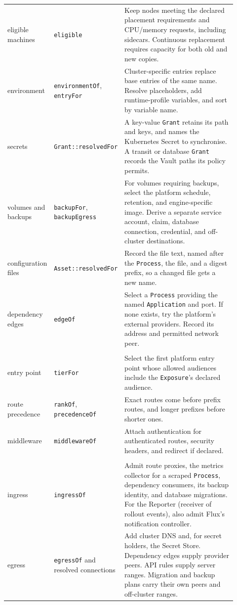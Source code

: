 \begin{longtable}{>{\raggedright\arraybackslash}p{0.19\linewidth}>{\raggedright\arraybackslash}p{0.24\linewidth}>{\raggedright\arraybackslash}p{0.49\linewidth}}
eligible machines & \texttt{eligible} & Keep nodes meeting the declared placement requirements and CPU/memory requests, including sidecars. Continuous replacement requires capacity for both old and new copies. \\
environment & \texttt{environmentOf}, \texttt{entryFor} & Cluster-specific entries replace base entries of the same name. Resolve placeholders, add runtime-profile variables, and sort by variable name. \\
secrets & \texttt{Grant::resolvedFor} & A key-value \texttt{Grant} retains its path and keys, and names the Kubernetes Secret to synchronise. A transit or database \texttt{Grant} records the Vault paths its policy permits. \\
volumes and backups & \texttt{backupFor}, \texttt{backupEgress} & For volumes requiring backups, select the platform schedule, retention, and engine-specific image. Derive a separate service account, claim, database connection, credential, and off-cluster destinations. \\
configuration files & \texttt{Asset::resolvedFor} & Record the file text, named after the \texttt{Process}, the file, and a digest prefix, so a changed file gets a new name. \\
dependency edges & \texttt{edgeOf} & Select a \texttt{Process} providing the named \texttt{Application} and port. If none exists, try the platform's external providers. Record its address and permitted network peer. \\
\multicolumn{3}{l}{\emph{Exposure}} \\
entry point & \texttt{tierFor} & Select the first platform entry point whose allowed audiences include the \texttt{Exposure}'s declared audience. \\
route precedence & \texttt{rankOf}, \texttt{precedenceOf} & Exact routes come before prefix routes, and longer prefixes before shorter ones. \\
middleware & \texttt{middlewareOf} & Attach authentication for authenticated routes, security headers, and redirect if declared. \\
\multicolumn{3}{l}{\emph{Network policy, per Process}} \\
ingress & \texttt{ingressOf} & Admit route proxies, the metrics collector for a scraped \texttt{Process}, dependency consumers, its backup identity, and database migrations. For the Reporter (receiver of rollout events), also admit Flux's notification controller. \\
egress & \texttt{egressOf} and resolved connections & Add cluster DNS and, for secret holders, the Secret Store. Dependency edges supply provider peers. API rules supply server ranges. Migration and backup plans carry their own peers and off-cluster ranges. \\

\end{longtable}
